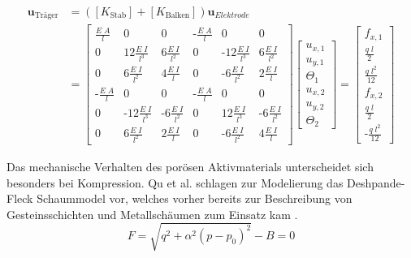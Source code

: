 \begin{align}
    [K_{\text{Elektrode}}] \boldsymbol{u}_{\text{Träger}} &= ([K_{\text{Stab}}] + [K_{\text{Balken}}])\boldsymbol{u}_{Elektrode}\\
    &= 
    \begin{bmatrix}
        \frac{E \; A}{l} & 0     & 0     &  \text{-}\frac{E \; A}{l}  & 0 & 0 \\
        0 & 12 \frac{E \; I}{l^3}     & 6 \frac{E \; I}{l^2} & 0    &\text{-}12\frac{E \; I}{l^3}  & 6 \frac{E \; I}{l^2}       \\
        0 & 6 \frac{E \; I}{l^2} & 4 \frac{E \; I}{l}  & 0    & \text{-}6 \frac{E \; I}{l^2}  & 2 \frac{E \; I}{l} \\
        \text{-}\frac{E \; A}{l} & 0     & 0     &  \text{-}\frac{E \; A}{l}  & 0 & 0 \\
        0 & \text{-}12\frac{E \; I}{l^3}    & \text{-}6 \frac{E \; I}{l^2}& 0 &12\frac{E \; I}{l^3}   & \text{-}6 \frac{E \; I}{l^2}      \\
        0 & 6 \frac{E \; I}{l^2} & 2 \frac{E \; I}{l} & 0    & \text{-}6 \frac{E \; I}{l^2} & 4 \frac{E \; I}{l}
    \end{bmatrix}
    \begin{bmatrix}
        u_{x,1}  \\
        u_{y,1}  \\
        \Theta_1 \\
        u_{x,2}  \\
        u_{y,2}  \\
        \Theta_2
    \end{bmatrix}
    = 
    \begin{bmatrix}
        f_{x,1} \\
        \frac{q \; l}{2}  \\
        \frac{q \; l^2}{12} \\
        f_{x,2} \\
        \frac{q \; l}{2}  \\
        \text{-}\frac{q \; l^2}{12}
    \end{bmatrix} 
\end{align}



Das mechanische Verhalten des porösen Aktivmaterials unterscheidet sich besonders bei Kompression. Qu et al.  schlagen zur Modelierung das Deshpande-Fleck Schaummodel \cite{Deshpande2000} vor, welches vorher bereits zur Beschreibung von Gesteinsschichten und Metallschäumen zum Einsatz kam \cite{Qu2023}.
\begin{equation}
    F = \sqrt{q^2 + \alpha^2 (p-p_0)^2} - B = 0
\end{equation}

